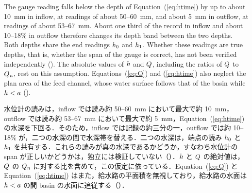 \begin{en}[M3-6]
The gauge reading falls below the depth of Equation~(\ref{eq:htime}) by up to about 10~mm in inflow, at readings of about 50--60~mm, and about 5~mm in outflow, at readings of about 53--67~mm. About one third of the record in inflow and about 10--18\% in outflow therefore changes its depth band between the two depths. Both depths share the end readings $h_{0}$ and $h_{1}$. Whether these readings are true depths, that is, whether the span of the gauge is correct, has not been verified independently (). The absolute values of $h$ and $Q$, including the ratios of $Q$ to $Q_{\mathit{n}}$, rest on this assumption. Equations~(\ref{eq:Q}) and (\ref{eq:htime}) also neglect the plan area of the feed channel, whose water surface follows that of the basin while $h < a$ ().
\end{en}
\begin{ja}
水位計の読みは，inflow では読み約 50--60~mm において最大で約 10~mm，outflow では読み約 53--67~mm において最大で約 5~mm，Equation~(\ref{eq:htime}) の水深を下回る．そのため，inflow では記録の約三分の一，outflow では約 10--18\% が，二つの水深の間で水深帯を替える．二つの水深は，端点の読み $h_{0}$ と $h_{1}$ を共有する．これらの読みが真の水深であるかどうか，すなわち水位計の span が正しいかどうかは，独立には検証していない（）．$h$ と $Q$ の絶対値は，$Q$ の $Q_{\mathit{n}}$ に対する比を含めて，この仮定に依っている．Equation~(\ref{eq:Q}) と Equation~(\ref{eq:htime}) はまた，給水路の平面積を無視しており，給水路の水面は $h < a$ の間 basin の水面に追従する（）．
\end{ja}

